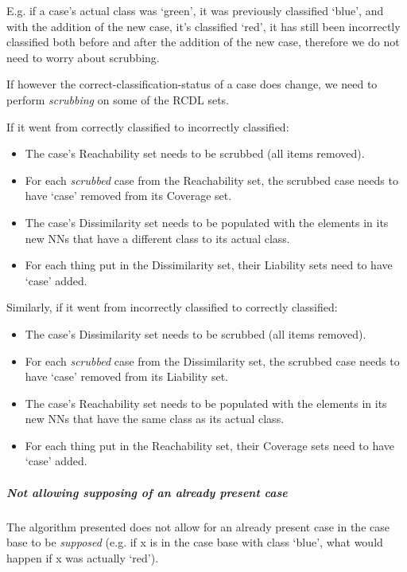 \documentclass[a4paper,11pt]{report}
\begin{document}
E.g. if a case's actual class was `green', it was previously classified `blue', and with the addition of the new case, it's classified `red', it has still been incorrectly classified both before and after the addition of the new case, therefore we do not need to worry about scrubbing.

If however the correct-classification-status of a case does change, we need to perform \emph{scrubbing} on some of the RCDL sets.

If it went from correctly classified to incorrectly classified:
\begin{itemize}
	\item The case's Reachability set needs to be scrubbed (all items removed).
	\item For each \emph{scrubbed} case from the Reachability set, the scrubbed case needs to have `case' removed from its Coverage set.
	\item The case's Dissimilarity set needs to be populated with the elements in its new NNs that have a different class to its actual class.
	\item For each thing put in the Dissimilarity set, their Liability sets need to have `case' added.
\end{itemize}

Similarly, if it went from incorrectly classified to correctly classified:
\begin{itemize}
	\item The case's Dissimilarity set needs to be scrubbed (all items removed).
	\item For each \emph{scrubbed} case from the Dissimilarity set, the scrubbed case needs to have `case' removed from its Liability set.
	\item The case's Reachability set needs to be populated with the elements in its new NNs that have the same class as its actual class.
	\item For each thing put in the Reachability set, their Coverage sets need to have `case' added.
\end{itemize}


\subparagraph{Not allowing supposing of an already present case}
The algorithm presented does not allow for an already present case in the case base to be \emph{supposed} (e.g. if x is in the case base with class `blue', what would happen if x was actually `red').
\end{document}
